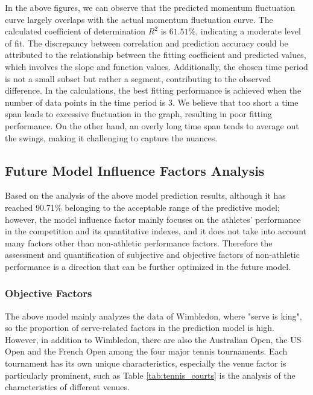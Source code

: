
In the above figures, we can observe that the predicted momentum fluctuation curve largely overlaps with the actual momentum fluctuation curve. The calculated coefficient of determination \(R^2\) is \(61.51\%\), indicating a moderate level of fit. The discrepancy between correlation and prediction accuracy could be attributed to the relationship between the fitting coefficient and predicted values, which involves the slope and function values. Additionally, the chosen time period is not a small subset but rather a segment, contributing to the observed difference. In the calculations, the best fitting performance is achieved when the number of data points in the time period is 3. We believe that too short a time span leads to excessive fluctuation in the graph, resulting in poor fitting performance. On the other hand, an overly long time span tends to average out the swings, making it challenging to capture the nuances.



\subsection{Future Model Influence Factors Analysis}
Based on the analysis of the above model prediction results, although it has reached 90.71\% belonging to the acceptable range of the predictive model; however, the model influence factor mainly focuses on the athletes' performance in the competition and its quantitative indexes, and it does not take into account many factors other than non-athletic performance factors. Therefore the assessment and quantification of subjective and objective factors of non-athletic performance is a direction that can be further optimized in the future model.

\subsubsection{Objective Factors}
The above model mainly analyzes the data of Wimbledon, where "serve is king", so the proportion of serve-related factors in the prediction model is high. However, in addition to Wimbledon, there are also the Australian Open, the US Open and the French Open among the four major tennis tournaments. Each tournament has its own unique characteristics, especially the venue factor is particularly prominent, such as Table \ref{tab:tennis_courts} is the analysis of the characteristics of different venues.

